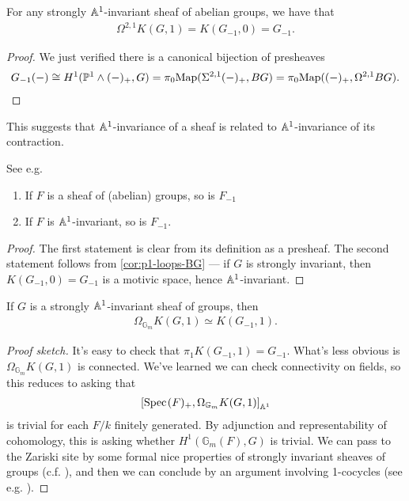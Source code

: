 \documentclass[11pt,openany]{book}
\let\smashprod\wedge
\begin{document}
\begin{corollary}\label{cor:p1-loops-BG} 
For any strongly $\mathbb{A}^1$-invariant sheaf of abelian groups, we have that 
\begin{align*}
    \Omega^{2,1} K(G,1) = K(G_{-1},0) = G_{-1}.
\end{align*}
\end{corollary}
\begin{proof} We just verified there is a canonical bijection of presheaves
\begin{align*}
    G_{-1}(-) \cong H^1(\P^1 \smashprod (-)_+, G) = \pi_0 \Map( \Sigma^{2,1} (-)_+, BG) = \pi_0 \Map ( (-)_+, \Omega^{2,1} BG).
\end{align*}
\end{proof}

This suggests that $\mathbb{A}^1$-invariance of a sheaf is related to $\mathbb{A}^1$-invariance of its contraction.


\begin{proposition} See e.g. \cite[\S4.1]{bachmannstrongly}
\begin{enumerate}
    \item If $F$ is a sheaf of (abelian) groups, so is $F_{-1}$
    \item If $F$ is $\mathbb{A}^1$-invariant, so is $F_{-1}$.
\end{enumerate}
\end{proposition}
\begin{proof} The first statement is clear from its definition as a presheaf. The second statement follows from \autoref{cor:p1-loops-BG} --- if $G$ is strongly invariant, then $K(G_{-1},0) = G_{-1}$ is a motivic space, hence $\mathbb{A}^1$-invariant.
\end{proof}


\begin{lemma}\label{lem:loops-KG1} 
If $G$ is a strongly $\mathbb{A}^1$-invariant sheaf of groups, then
\begin{align*}
    \Omega_{\mathbb{G}_m} K(G,1) \simeq K(G_{-1},1).
\end{align*}
\end{lemma}
\begin{proof}[Proof sketch] It's easy to check that $\pi_1 K(G_{-1},1) = G_{-1}$. What's less obvious is $\Omega_{\mathbb{G}_m} K(G,1)$ is connected. We've learned we can check connectivity on fields, so this reduces to asking that
\begin{align*}
    \left[ \text{Spec}\hspace{0.1em}(F)_+, \Omega_{\mathbb{G}_m} K(G,1) \right]_{\mathbb{A}^1}
\end{align*}
is trivial for each $F/k$ finitely generated. By adjunction and representability of cohomology, this is asking whether $H^1(\mathbb{G}_m(F), G)$ is trivial. We can pass to the Zariski site by some formal nice properties of strongly invariant sheaves of groups (c.f. \cite[2.24]{Morel}), and then we can conclude by an argument involving 1-cocycles (see e.g. \cite[4.2]{bachmannstrongly}).
\end{proof}
\end{document}
